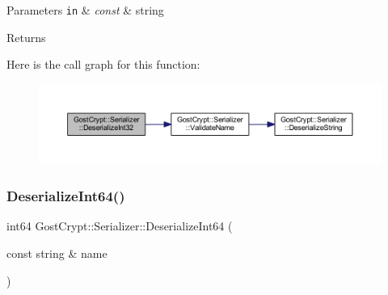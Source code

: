 \begin{DoxyParams}[1]{Parameters}
\mbox{\tt in}  & {\em const} & string \\
\hline
\end{DoxyParams}
\begin{DoxyReturn}{Returns}

\end{DoxyReturn}
Here is the call graph for this function\+:
\nopagebreak
\begin{figure}[H]
\begin{center}
\leavevmode
\includegraphics[width=350pt]{class_gost_crypt_1_1_serializer_a5fb6eca3b3bbee7d5cb540a02b156ca9_cgraph}
\end{center}
\end{figure}
\mbox{\label{class_gost_crypt_1_1_serializer_afc8c758b68227ecc0b2abc8f8fb7d52d}} 
\subsubsection{\texorpdfstring{Deserialize\+Int64()}{DeserializeInt64()}}
{\footnotesize\ttfamily int64 Gost\+Crypt\+::\+Serializer\+::\+Deserialize\+Int64 (\begin{DoxyParamCaption}\item[{const string \&}]{name }\end{DoxyParamCaption})}


